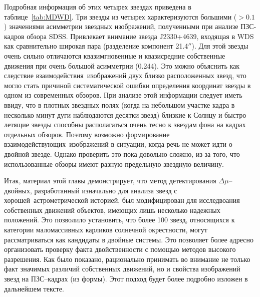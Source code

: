 Подробная информация об этих четырех звездах приведена в таблице~\ref{tab:MDWD}. Три звезды из четырех характеризуются большими ($>0.1$) значениями асимметрии звездных изображений, полученными при анализе ПЗС-кадров обзора SDSS. Привлекает внимание звезда J2330+4639, входящая в WDS как сравнительно широкая пара (разделение компонент 21.4$''$). Для этой звезды очень сильно отличаются квазимгновенные и квазисредние собственные движения при очень большой асимметрии (0.244). Это можно объяснить как следствие \glqq взаимодействия\grqq\ изображений двух близко расположенных звезд, что могло стать причиной систематической ошибки определения координат звезды в одном из современных обзоров. При анализе этой информации следует иметь ввиду, что в плотных звездных полях (когда на небольшом участке кадра в несколько минут дуги наблюдаются десятки звезд) близкие к Солнцу и быстро летящие звезды способны располагаться очень тесно к звездам фона на кадрах отдельных обзоров. Поэтому возможно формирование \glqq взаимодействующих\grqq\ изображений в ситуации, когда речь не может идти о двойной звезде. Однако проверить это пока довольно сложно, из-за того, что использованные обзоры имеют разную предельную звездную величину.

Итак, материал этой главы демонстрирует, что метод детектирования $\Delta\mu$--двойных, разработанный изначально для анализа звезд с \glqq хорошей\grqq\ астрометрической историей, был модифицирован для исследвоания собственных движений объектов, имеющих лишь несколько надежных положений. Это позволило установить, что более 100 звезд, относящихся к категории маломассивных карликов солнечной окрестности, могут рассматриваться как кандидаты в двойные системы. Это позволяет более адресно организовать проверку факта двойственности с помощью методов высокого разрешения. Как было показано, рационально принимать во внимание не только факт значимых различий собственных движений, но и свойства изображений звезд на ПЗС--кадрах (из формы). Этот подход будет более подробно изложен в дальнейшем тексте.

